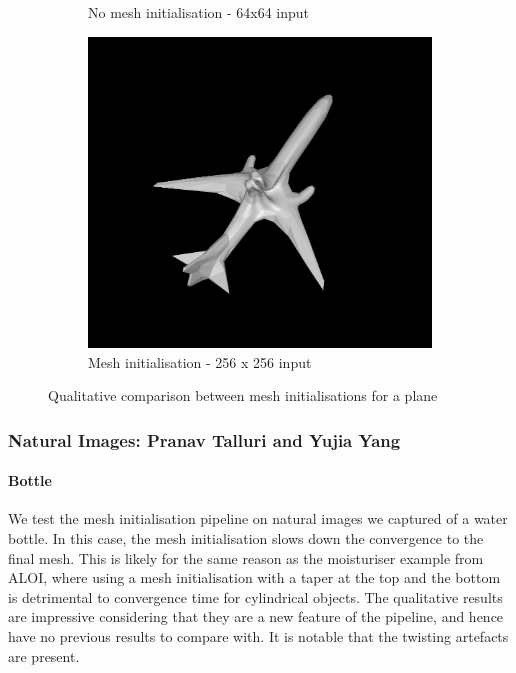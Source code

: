 \documentclass{article}
\begin{document}
\begin{figure}[h!]
\begin{subfigure}{.3\textwidth}
    \caption{No mesh initialisation - 64x64 input}
    \label{results-plane-mesh2}
  \end{subfigure}
  \hfill
  \begin{subfigure}{.3\textwidth}
    \centering
    \includegraphics[width=\textwidth]{images/planemesh_b.png}
    \caption{Mesh initialisation - 256 x 256 input}
    \label{results-plane-mesh3}
  \end{subfigure}
  \caption{Qualitative comparison between mesh initialisations for a plane}
  \label{results-plane}
\end{figure}

\newpage
\subsubsection{Natural Images: Pranav Talluri and Yujia Yang}
\paragraph{Bottle}

We test the mesh initialisation pipeline on natural images we captured of a water bottle. In this case, the mesh initialisation slows down the convergence to the final mesh. This is likely for the same reason as the moisturiser example from ALOI, where using a mesh initialisation with a taper at the top and the bottom is detrimental to convergence time for cylindrical objects. The qualitative results are impressive considering that they are a new feature of the pipeline, and hence have no previous results to compare with. It is notable that the twisting artefacts are present.
\end{document}
